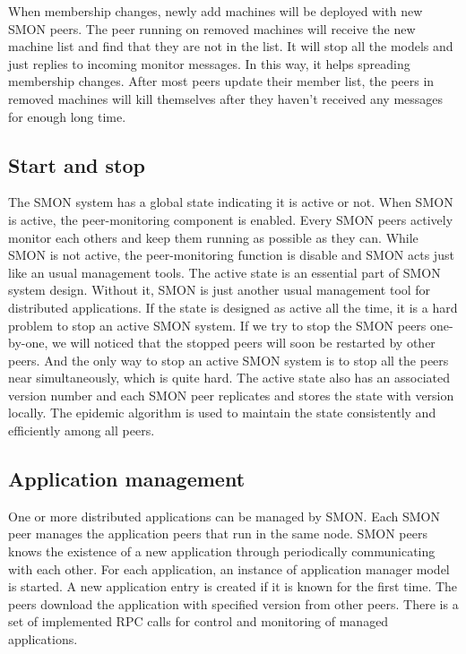 When membership changes, newly add machines will be deployed
with new SMON peers. The peer running on removed machines
will receive the new machine list and find that they are not
in the list. It will stop all the models and just replies to
incoming monitor messages. In this way, it helps spreading
membership changes. After most peers update their member
list, the peers in removed machines will kill themselves
after they haven't received any messages for enough long
time.

\subsection{Start and stop}
\label{subsec:livetag}

The SMON system has a global state indicating it is active
or not. When SMON is active, the peer-monitoring component
is enabled. Every SMON peers actively monitor each others
and keep them running as possible as they can. While SMON is
not active, the peer-monitoring function is disable and SMON
acts just like an usual management tools. The active state
is an essential part of SMON system design. Without it, SMON
is just another usual management tool for distributed
applications. If the state is designed as active all the
time, it is a hard problem to stop an active SMON system. If
we try to stop the SMON peers one-by-one, we will noticed
that the stopped peers will soon be restarted by other
peers. And the only way to stop an active SMON system is to
stop all the peers near simultaneously, which is quite hard.
The active state also has an associated version number and
each SMON peer replicates and stores the state with version
locally.  The epidemic algorithm is used to maintain the
state consistently and efficiently among all peers.

\subsection{Application management}

One or more distributed applications can be managed by SMON.
Each SMON peer manages the application peers that run in the
same node. SMON peers knows the existence of a new
application through periodically communicating with each
other. For each application, an instance of application
manager model is started.  A new application entry is
created if it is known for the first time.  The peers
download the application with specified version from other
peers. There is a set of implemented RPC calls for control
and monitoring of managed applications.

